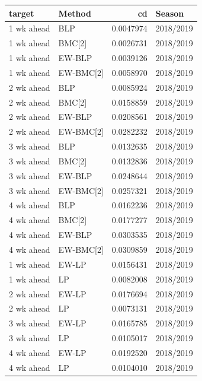 \documentclass[
]{article}
\begin{document}
\begin{tabular}{l|l|r|l}
\hline
target & Method & cd & Season\\
\hline
1 wk ahead & BLP & 0.0047974 & 2018/2019\\
\hline
1 wk ahead & BMC[2] & 0.0026731 & 2018/2019\\
\hline
1 wk ahead & EW-BLP & 0.0039126 & 2018/2019\\
\hline
1 wk ahead & EW-BMC[2] & 0.0058970 & 2018/2019\\
\hline
2 wk ahead & BLP & 0.0085924 & 2018/2019\\
\hline
2 wk ahead & BMC[2] & 0.0158859 & 2018/2019\\
\hline
2 wk ahead & EW-BLP & 0.0208561 & 2018/2019\\
\hline
2 wk ahead & EW-BMC[2] & 0.0282232 & 2018/2019\\
\hline
3 wk ahead & BLP & 0.0132635 & 2018/2019\\
\hline
3 wk ahead & BMC[2] & 0.0132836 & 2018/2019\\
\hline
3 wk ahead & EW-BLP & 0.0248644 & 2018/2019\\
\hline
3 wk ahead & EW-BMC[2] & 0.0257321 & 2018/2019\\
\hline
4 wk ahead & BLP & 0.0162236 & 2018/2019\\
\hline
4 wk ahead & BMC[2] & 0.0177277 & 2018/2019\\
\hline
4 wk ahead & EW-BLP & 0.0303535 & 2018/2019\\
\hline
4 wk ahead & EW-BMC[2] & 0.0309859 & 2018/2019\\
\hline
1 wk ahead & EW-LP & 0.0156431 & 2018/2019\\
\hline
1 wk ahead & LP & 0.0082008 & 2018/2019\\
\hline
2 wk ahead & EW-LP & 0.0176694 & 2018/2019\\
\hline
2 wk ahead & LP & 0.0073131 & 2018/2019\\
\hline
3 wk ahead & EW-LP & 0.0165785 & 2018/2019\\
\hline
3 wk ahead & LP & 0.0105017 & 2018/2019\\
\hline
4 wk ahead & EW-LP & 0.0192520 & 2018/2019\\
\hline
4 wk ahead & LP & 0.0104010 & 2018/2019\\
\hline
\end{tabular}
\end{document}

